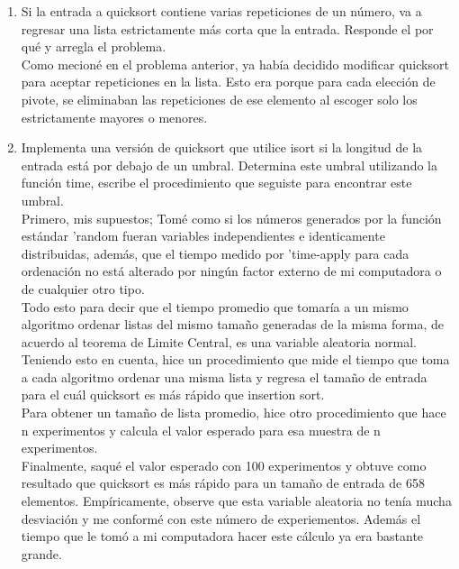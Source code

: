\documentclass[12pt]{article}
\begin{document}
\begin{enumerate}
		\item{Si la entrada a quicksort contiene varias repeticiones de un número, va a regresar una lista estrictamente más corta que la entrada. 
				Responde el por qué y arregla el problema.}\\
				Como mecion\'e en el problema anterior, ya hab\'ia decidido modificar quicksort para aceptar repeticiones en la lista. Esto era porque
				para cada elecci\'on de pivote, se eliminaban las repeticiones de ese elemento al escoger solo los estrictamente mayores o menores.\\

\setcounter{enumi}{12}
		\item{Implementa una versión de quicksort que utilice isort si la longitud de la entrada está por debajo de un umbral. 
				Determina este umbral utilizando la función time, escribe el procedimiento que seguiste para encontrar este umbral.}\\

				Primero, mis supuestos; Tom\'e como si los n\'umeros generados por la funci\'on est\'andar 'random fueran variables independientes e identicamente
				distribuidas, adem\'as, que el tiempo medido por 'time-apply para cada ordenaci\'on no est\'a alterado por ning\'un factor externo de mi computadora
				o de cualquier otro tipo.\\ 
				Todo esto para decir que el tiempo promedio que tomar\'ia a un mismo algoritmo ordenar listas del mismo tama\~no generadas de la misma forma, 
				de acuerdo al teorema de Limite Central, es una variable aleatoria normal.\\

				Teniendo esto en cuenta, hice un procedimiento que mide el tiempo que toma a cada algoritmo ordenar una misma lista y regresa el tama\~no de entrada
				para el cu\'al quicksort es m\'as r\'apido que insertion sort.\\

				Para obtener un tama\~no de lista promedio, hice otro procedimiento que hace n experimentos y 
				calcula el valor esperado para esa muestra de n experimentos.\\

				Finalmente, saqu\'e el valor esperado con 100 experimentos y obtuve como resultado que quicksort es m\'as r\'apido para un tama\~no de entrada de 658
				elementos. Emp\'iricamente, observe que esta variable aleatoria no ten\'ia mucha desviaci\'on y me conform\'e con este n\'umero de experiementos.
				Adem\'as el tiempo que le tom\'o a mi computadora hacer este c\'alculo ya era bastante grande.\\


\end{enumerate}
\end{document}
